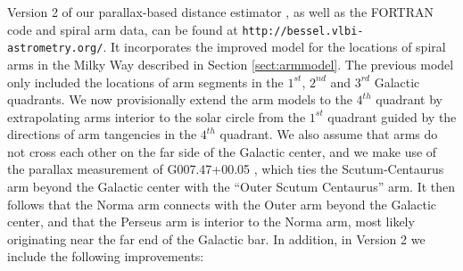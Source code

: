 \documentclass[12pt,preprint]{aastex}
\begin{document}
Version 2 of our parallax-based distance estimator \citep{Reid:16},
as well as the {\footnotesize FORTRAN} code and spiral arm data, 
can be found at {\tt http://bessel.vlbi-astrometry.org/}.
It incorporates the improved model for the locations of spiral arms in the Milky Way 
described in Section \ref{sect:armmodel}.  The previous model only included the 
locations of arm segments in the $1^{st}$, $2^{nd}$ and $3^{rd}$ Galactic quadrants.
We now provisionally extend the arm models to the $4^{th}$ quadrant by extrapolating 
arms interior to the solar circle from the $1^{st}$ quadrant guided by the directions 
of arm tangencies in the $4^{th}$ quadrant.  We also assume that arms do not cross each 
other on the far side of the Galactic center, and we make use of the parallax measurement 
of G007.47+00.05 \citep{Sanna17}, which ties the Scutum-Centaurus arm beyond the Galactic 
center with the ``Outer Scutum Centaurus'' arm.  It then follows that the Norma arm connects 
with the Outer arm beyond the Galactic center, and that the Perseus arm is interior to
the Norma arm, most likely originating near the far end of the Galactic bar.  
In addition, in Version 2 we include the following improvements:
\end{document}
